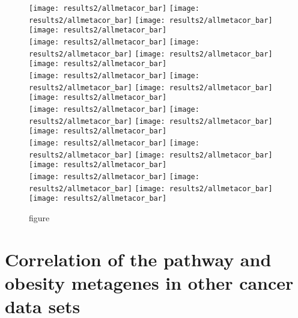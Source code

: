 	\begin{figure}[htpb]
		\ContinuedFloat
		\captionsetup{list=off,format=cont}
		\centering
		\texttt{[image: results2/allmetacor\_bar]}
		\texttt{[image: results2/allmetacor\_bar]}
		\texttt{[image: results2/allmetacor\_bar]}
		\texttt{[image: results2/allmetacor\_bar]}\\
		\texttt{[image: results2/allmetacor\_bar]}
		\texttt{[image: results2/allmetacor\_bar]}
		\texttt{[image: results2/allmetacor\_bar]}
		\texttt{[image: results2/allmetacor\_bar]}\\
		\texttt{[image: results2/allmetacor\_bar]}
		\texttt{[image: results2/allmetacor\_bar]}
		\texttt{[image: results2/allmetacor\_bar]}
		\texttt{[image: results2/allmetacor\_bar]}\\
		\texttt{[image: results2/allmetacor\_bar]}
		\texttt{[image: results2/allmetacor\_bar]}
		\texttt{[image: results2/allmetacor\_bar]}
		\texttt{[image: results2/allmetacor\_bar]}\\
		\texttt{[image: results2/allmetacor\_bar]}
		\texttt{[image: results2/allmetacor\_bar]}
		\texttt{[image: results2/allmetacor\_bar]}
		\texttt{[image: results2/allmetacor\_bar]}\\
		\texttt{[image: results2/allmetacor\_bar]}
		\texttt{[image: results2/allmetacor\_bar]}
		\texttt{[image: results2/allmetacor\_bar]}
		\texttt{[image: results2/allmetacor\_bar]}\\
		\caption{figure}
	\end{figure}
	\newpage

	\section{Correlation of the pathway and obesity metagenes in other cancer data sets}
	\label{sec:correlation_of_the_pathway_and_obesity_metagenes_in_other_cancer_data_sets}

